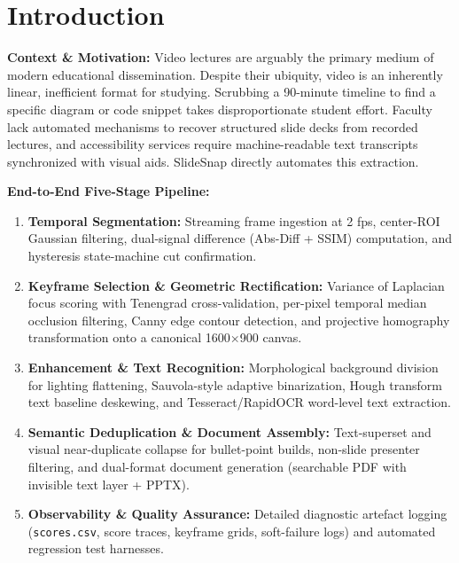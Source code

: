 \documentclass[10pt,a4paper]{article}
\begin{document}
\newpage

\section{Introduction}

\textbf{Context \& Motivation:} Video lectures are arguably the primary medium of modern educational dissemination. Despite their ubiquity, video is an inherently linear, inefficient format for studying. Scrubbing a 90-minute timeline to find a specific diagram or code snippet takes disproportionate student effort. Faculty lack automated mechanisms to recover structured slide decks from recorded lectures, and accessibility services require machine-readable text transcripts synchronized with visual aids. SlideSnap directly automates this extraction.

\textbf{End-to-End Five-Stage Pipeline:}
\begin{enumerate}[leftmargin=6mm, itemsep=1pt, topsep=2pt]
  \item \textbf{Temporal Segmentation:} Streaming frame ingestion at 2 fps, center-ROI Gaussian filtering, dual-signal difference (Abs-Diff + SSIM) computation, and hysteresis state-machine cut confirmation.
  \item \textbf{Keyframe Selection \& Geometric Rectification:} Variance of Laplacian focus scoring with Tenengrad cross-validation, per-pixel temporal median occlusion filtering, Canny edge contour detection, and projective homography transformation onto a canonical 1600$\times$900 canvas.
  \item \textbf{Enhancement \& Text Recognition:} Morphological background division for lighting flattening, Sauvola-style adaptive binarization, Hough transform text baseline deskewing, and Tesseract/RapidOCR word-level text extraction.
  \item \textbf{Semantic Deduplication \& Document Assembly:} Text-superset and visual near-duplicate collapse for bullet-point builds, non-slide presenter filtering, and dual-format document generation (searchable PDF with invisible text layer + PPTX).
  \item \textbf{Observability \& Quality Assurance:} Detailed diagnostic artefact logging (\texttt{scores.csv}, score traces, keyframe grids, soft-failure logs) and automated regression test harnesses.
\end{enumerate}
\end{document}
